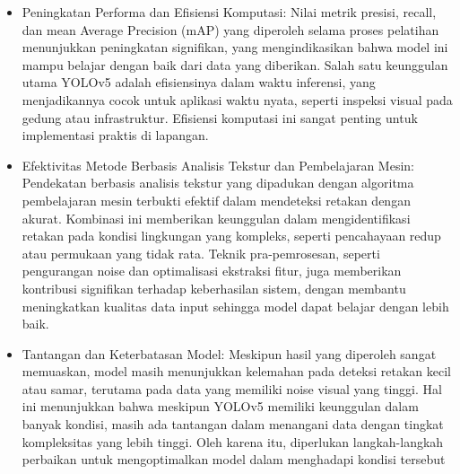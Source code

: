 \documentclass[12pt,a4paper]{article}
\begin{document}
\begin{adjustwidth}{3em}{0pt}
\begin{itemize}
    \item Peningkatan Performa dan Efisiensi Komputasi: Nilai metrik presisi, recall, dan mean Average Precision (mAP) yang diperoleh selama proses pelatihan menunjukkan peningkatan signifikan, yang mengindikasikan bahwa model ini mampu belajar dengan baik dari data yang diberikan. Salah satu keunggulan utama YOLOv5 adalah efisiensinya dalam waktu inferensi, yang menjadikannya cocok untuk aplikasi waktu nyata, seperti inspeksi visual pada gedung atau infrastruktur. Efisiensi komputasi ini sangat penting untuk implementasi praktis di lapangan.

    \item Efektivitas Metode Berbasis Analisis Tekstur dan Pembelajaran Mesin: Pendekatan berbasis analisis tekstur yang dipadukan dengan algoritma pembelajaran mesin terbukti efektif dalam mendeteksi retakan dengan akurat. Kombinasi ini memberikan keunggulan dalam mengidentifikasi retakan pada kondisi lingkungan yang kompleks, seperti pencahayaan redup atau permukaan yang tidak rata. Teknik pra-pemrosesan, seperti pengurangan noise dan optimalisasi ekstraksi fitur, juga memberikan kontribusi signifikan terhadap keberhasilan sistem, dengan membantu meningkatkan kualitas data input sehingga model dapat belajar dengan lebih baik.

    \item Tantangan dan Keterbatasan Model: Meskipun hasil yang diperoleh sangat memuaskan, model masih menunjukkan kelemahan pada deteksi retakan kecil atau samar, terutama pada data yang memiliki noise visual yang tinggi. Hal ini menunjukkan bahwa meskipun YOLOv5 memiliki keunggulan dalam banyak kondisi, masih ada tantangan dalam menangani data dengan tingkat kompleksitas yang lebih tinggi. Oleh karena itu, diperlukan langkah-langkah perbaikan untuk mengoptimalkan model dalam menghadapi kondisi tersebut

\end{itemize}


\end{adjustwidth}
\end{document}

